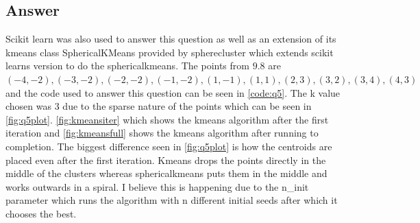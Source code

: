 \documentclass[11pt]{article}
\begin{document}
\subsection{Answer} 
Scikit learn was also used to answer this question as well as an extension of its kmeans class SphericalKMeans provided by spherecluster which extends scikit learns version to do the sphericalkmeans. 
The points from $9.8$ are $(-4, -2), (-3, -2), (-2, -2), (-1, -2), (1, -1), (1, 1), (2, 3), (3, 2), (3, 4), (4, 3)$ and the code used to answer this question can be seen in \autoref{code:q5}.  The k value chosen was 3 due to the sparse nature of the points which can be seen in \autoref{fig:q5plot}. \autoref{fig:kmeansiter} which shows the kmeans algorithm after the first iteration and \autoref{fig:kmeansfull} shows the kmeans algorithm after running to completion. The biggest difference seen in \autoref{fig:q5plot} is how the centroids are placed even after the first iteration. Kmeans drops the points directly in the middle of the clusters whereas sphericalkmeans puts them in the middle and works outwards in a spiral.  I believe this is happening due to the n\_init parameter which runs the algorithm with n different initial seeds after which it chooses the best.
\end{document}
